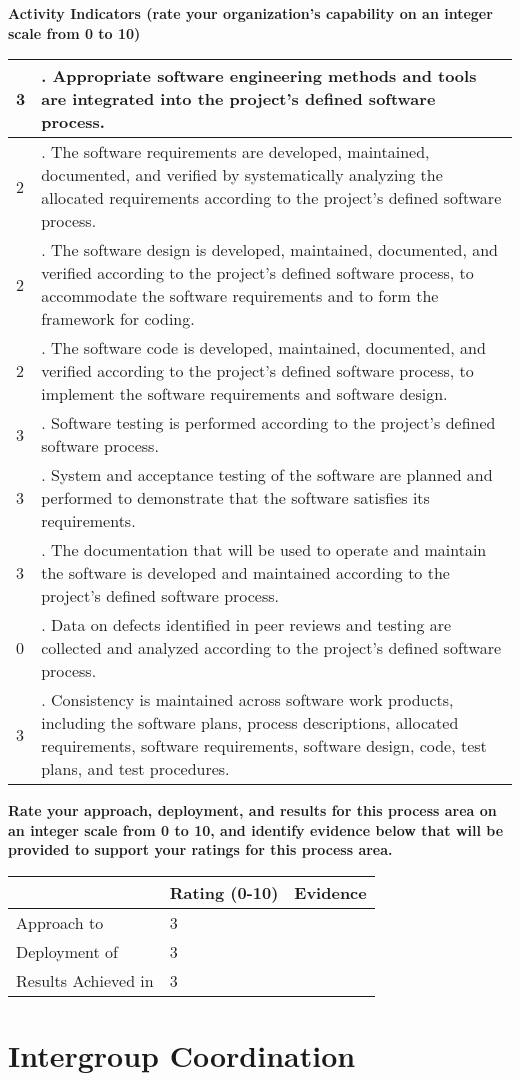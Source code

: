 \documentclass{article}
\newcommand{\KPAname}{}
\let\KPAsection=\section
\renewcommand{\section}[1]{\renewcommand{\KPAname}{#1}\KPAsection{#1}}
\newcounter{activity}		%
\newenvironment{KPAActivity}
{
    \setcounter{activity}{0} %
    {\bf Activity Indicators (rate your organization's capability
    on an integer scale from 0 to 10)} %
    \begin{center}
    \begin{tabular}{|p{0.5in}|p{6.0in}|} \hline %
}
{
    \end{tabular}
    \end{center}
}
\newcommand{\Activity}[2]
{
    \stepcounter{activity} #1 & \arabic{activity}. #2 \\ \hline
} %
\newenvironment{KPARate}
{
    {\bf Rate your approach, deployment, and results for
    this process area on an integer scale from 0 to 10, and 
    identify evidence below that will be provided to support your
    ratings for this process area.}
    \begin{center}
    \begin{tabular}{|p{1.0in}|p{0.5in}|p{5.0in}|} \hline
    & Rating (0-10) & \multicolumn{1}{c|}{Evidence} \\ \hline
}
{
    \end{tabular}
    \end{center}
}
\newcommand{\Approach}[2]{Approach to \KPAname & #1 & #2 \\ \hline}
\newcommand{\Deployment}[2]{Deployment of \KPAname & #1 & #2 \\ \hline}
\newcommand{\Results}[2]{Results Achieved in \KPAname & #1 & #2 \\
	\hline}
\begin{document}
\begin{KPAActivity}
\Activity{3}{Appropriate software engineering methods and tools are
integrated into the project's defined software process.}
\Activity{2}{The software requirements are developed, maintained,
documented, and verified by systematically analyzing the allocated
requirements according to the project's defined software process.}
\Activity{2}{The software design is developed, maintained, documented,
and verified according to the project's defined software process, to
accommodate the software requirements and to form the framework for
coding.}
\Activity{2}{The software code is developed, maintained, documented,
and verified according to the project's defined software process, to
implement the software requirements and software design.}
\Activity{3}{Software testing is performed according to the project's
defined software process.}
\Activity{3}{System and acceptance testing of the software are planned
and performed to demonstrate that the software satisfies its
requirements.}
\Activity{3}{The documentation that will be used to operate and
maintain the software is developed and maintained according to the
project's defined software process.}
\Activity{0}{Data on defects identified in peer reviews and testing are
collected and analyzed according to the project's defined software
process.}
\Activity{3}{Consistency is maintained across software work products,
including the software plans, process descriptions, allocated
requirements, software requirements, software design, code, test
plans, and test procedures.}
\end{KPAActivity}

\begin{KPARate}
\Approach{3}{}
\Deployment{3}{}
\Results{3}{}
\end{KPARate}

\newpage
\section{Intergroup Coordination}
\end{document}
